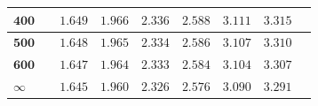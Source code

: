 \begin{customTableWrapper}{1.3}
\begin{longtable}{|l|l l|l|l|l|l|l|l|}
    $\mathbf{400}$ & & ${1.649}$   & ${1.966}$   & ${2.336}$   & ${2.588}$   & ${3.111}$   & ${3.315}$   \\ \hline
    
    $\mathbf{500}$ & & ${1.648}$   & ${1.965}$   & ${2.334}$   & ${2.586}$   & ${3.107}$   & ${3.310}$   \\ \hline
    
    $\mathbf{600}$ & & ${1.647}$   & ${1.964}$   & ${2.333}$   & ${2.584}$   & ${3.104}$   & ${3.307}$   \\ \hline
 
 $\infty$ & & ${1.645}$   & ${1.960}$   & ${2.326}$   & ${2.576}$   & ${3.090}$   & ${3.291}$   \\ \hline
\end{longtable}
\end{customTableWrapper}
\changefontsizes{11pt}

